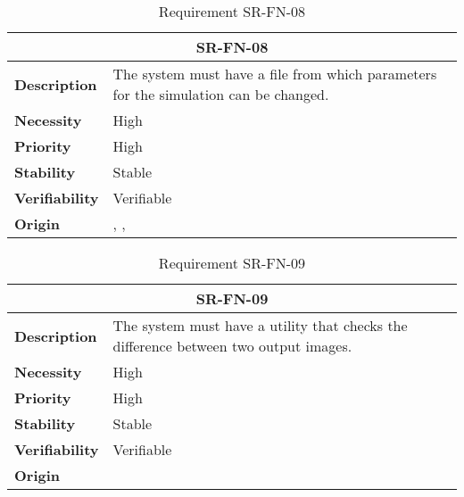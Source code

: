 \begin{table}[H]
    \centering
    \begin{tabular}{l p{10cm}}
        \toprule
        \multicolumn{2}{c}{SR-FN-08} \\
        \toprule
        \textbf{Description}        &  The system must have a file from which parameters for the simulation can be changed. \\
        \textbf{Necessity}          &  High \\
        \textbf{Priority}           &  High \\
        \textbf{Stability}          &  Stable \\
        \textbf{Verifiability}      & Verifiable \\
        \textbf{Origin}             & \textit{\nameref{tab:ur-ca-05}}, \textit{\nameref{tab:ur-ca-06}}, \textit{\nameref{tab:ur-ca-14}} \\
    \end{tabular}
    \caption{Requirement SR-FN-08}
    \label{tab:sr-fn-08}
\end{table}

\begin{table}[H]
    \centering
    \begin{tabular}{l p{10cm}}
        \toprule
        \multicolumn{2}{c}{SR-FN-09} \\
        \toprule
        \textbf{Description}        &  The system must have a utility that checks the difference between two output images. \\
        \textbf{Necessity}          &  High \\
        \textbf{Priority}           &  High \\
        \textbf{Stability}          &  Stable \\
        \textbf{Verifiability}      & Verifiable \\
        \textbf{Origin}             & \textit{\nameref{tab:ur-ca-04}} \\
    \end{tabular}
    \caption{Requirement SR-FN-09}
    \label{tab:sr-fn-09}
\end{table}



